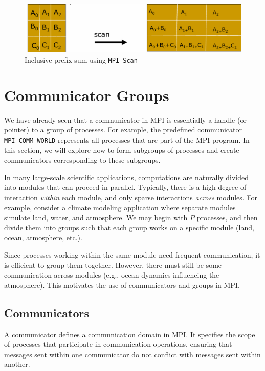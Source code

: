 \documentclass[12pt]{book}
\begin{document}
\begin{figure}[H]
    \centering
    \includegraphics[width=0.75\linewidth]{images/scan.png}
    \caption{Inclusive prefix sum using \texttt{MPI\_Scan}}
    \label{fig:scan}
\end{figure}









\section{Communicator Groups}

We have already seen that a communicator in MPI is essentially a handle (or pointer) to a group of processes. For example, the predefined communicator \texttt{MPI\_COMM\_WORLD} represents all processes that are part of the MPI program. In this section, we will explore how to form subgroups of processes and create communicators corresponding to these subgroups.

In many large-scale scientific applications, computations are naturally divided into modules that can proceed in parallel. Typically, there is a high degree of interaction \emph{within} each module, and only sparse interactions \emph{across} modules.  
For example, consider a climate modeling application where separate modules simulate land, water, and atmosphere. We may begin with $P$ processes, and then divide them into groups such that each group works on a specific module (land, ocean, atmosphere, etc.).  

Since processes working within the same module need frequent communication, it is efficient to group them together. However, there must still be some communication across modules (e.g., ocean dynamics influencing the atmosphere). This motivates the use of communicators and groups in MPI.

\subsection{Communicators}
A communicator defines a communication domain in MPI. It specifies the scope of processes that participate in communication operations, ensuring that messages sent within one communicator do not conflict with messages sent within another.  
\end{document}

